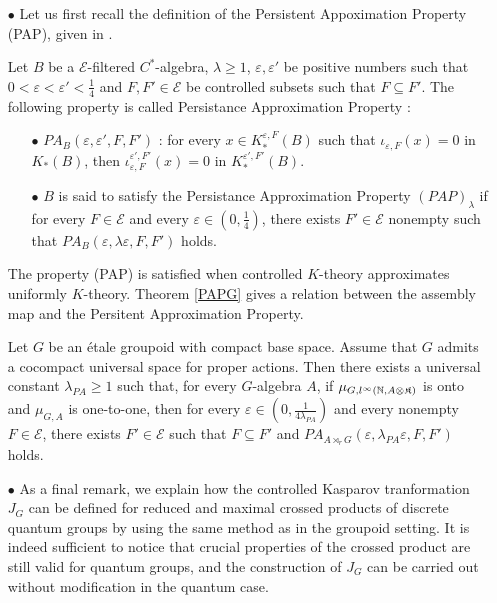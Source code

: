 \begin{itemize}

\item[$\bullet$] Let us first recall the definition of the Persistent Appoximation Property (PAP), given in \cite{OY3}.\\

\begin{definition}
Let $B$ be a $\mathcal E$-filtered $C^*$-algebra, $\lambda \geq 1$, $\varepsilon,\varepsilon'$ be positive numbers such that $0<\varepsilon <\varepsilon' <\frac{1}{4}$ and $F,F'\in\mathcal E$ be controlled subsets such that $F\subseteq F'$. The following property is called Persistance Approximation Property :
\begin{itemize}
\item[$\bullet$] $PA_B(\varepsilon,\varepsilon',F,F')$ : for every $x\in K_*^{\varepsilon,F}(B)$ such that $\iota_{\varepsilon,F}(x)=0$ in $K_*(B)$, then $\iota_{\varepsilon,F}^{\varepsilon',F'}(x)=0$ in $K_*^{\varepsilon',F'}(B)$.
\item[$\bullet$] $B$ is said to satisfy the Persistance Approximation Property $(PAP)_\lambda$ if for every $F\in\mathcal E$ and every $\varepsilon\in (0,\frac{1}{4})$, there exists $F'\in\mathcal E$ nonempty such that $PA_B(\varepsilon,\lambda\varepsilon,F,F')$ holds.\\
\end{itemize}
\end{definition}

The property (PAP) is satisfied when controlled $K$-theory approximates uniformly $K$-theory. Theorem \ref{PAPG} gives a relation between the assembly map and the Persitent Approximation Property. \\

\begin{thm} 
Let $G$ be an étale groupoid with compact base space. Assume that $G$ admits a cocompact universal space for proper actions. Then there exists a universal constant $\lambda_{PA} \geq 1$ such that, for every $G$-algebra $A$, if $\mu_{G,l^\infty(\mathbb N, A\otimes\mathfrak K)}$ is onto and $\mu_{G,A}$ is one-to-one, then for every $\varepsilon \in(0,\frac{1}{4\lambda_{PA}})$ and every nonempty $F\in\mathcal E$, there exists $F'\in\mathcal E$ such that $F\subseteq F'$ and $PA_{A\rtimes_r G}(\varepsilon,\lambda_{PA}\varepsilon,F,F')$ holds.\\
\end{thm}

\item[$\bullet$] As a final remark, we explain how the controlled Kasparov tranformation $J_G$ can be defined for reduced and maximal crossed products of discrete quantum groups by using the same method as in the groupoid setting. It is indeed sufficient to notice that crucial properties of the crossed product are still valid for quantum groups, and the construction of $J_G$ can be carried out without modification in the quantum case.\\


\end{itemize}
